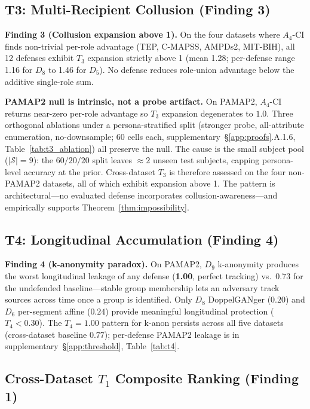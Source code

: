 \documentclass{article}
\theoremstyle{remark}
\begin{document}
\subsection{T3: Multi-Recipient Collusion (Finding 3)}

\textbf{Finding 3 (Collusion expansion above 1).} On the four datasets where $A_4$-CI finds non-trivial per-role advantage (TEP, C-MAPSS, AMPDs2, MIT-BIH), all 12 defenses exhibit $T_3$ expansion strictly above 1 (mean 1.28; per-defense range 1.16 for $D_8$ to 1.46 for $D_5$). No defense reduces role-union advantage below the additive single-role sum.

\textbf{PAMAP2 null is intrinsic, not a probe artifact.} On PAMAP2, $A_4$-CI returns near-zero per-role advantage so $T_3$ expansion degenerates to $1.0$. Three orthogonal ablations under a persona-stratified split (stronger probe, all-attribute enumeration, no-downsample; 60 cells each, supplementary~\S\ref{app:proofs}.A.1.6, Table~\ref{tab:t3_ablation}) all preserve the null. The cause is the small subject pool ($|\mathcal{S}| = 9$): the $60/20/20$ split leaves $\approx 2$ unseen test subjects, capping persona-level accuracy at the prior. Cross-dataset $T_3$ is therefore assessed on the four non-PAMAP2 datasets, all of which exhibit expansion above 1. The pattern is architectural---no evaluated defense incorporates collusion-awareness---and empirically supports Theorem~\ref{thm:impossibility}.

\subsection{T4: Longitudinal Accumulation (Finding 4)}

\textbf{Finding 4 (k-anonymity paradox).} On PAMAP2, $D_9$ k-anonymity produces the worst longitudinal leakage of any defense (\textbf{1.00}, perfect tracking) vs.\ $0.73$ for the undefended baseline---stable group membership lets an adversary track sources across time once a group is identified. Only $D_8$ DoppelGANger ($0.20$) and $D_6$ per-segment affine ($0.24$) provide meaningful longitudinal protection ($T_4 < 0.30$). The $T_4 = 1.00$ pattern for k-anon persists across all five datasets (cross-dataset baseline $0.77$); per-defense PAMAP2 leakage is in supplementary~\S\ref{app:threshold}, Table~\ref{tab:t4}.

\subsection{Cross-Dataset $T_1$ Composite Ranking (Finding 1)}
\end{document}
